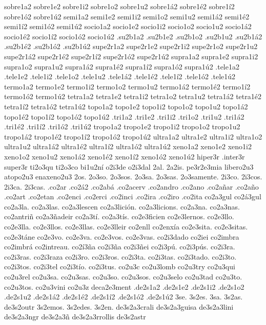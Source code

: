 {sobre1a2 sobre1e2 sobre1i2 sobre1o2 sobre1u2 sobre1á2 sobre1é2 sobre1í2 sobre1ó2 sobre1ú2
semi1a2 semi1e2 semi1i2 semi1o2 semi1u2 semi1á2 semi1é2 semi1í2 semi1ó2 semi1ú2
socio1a2 socio1e2 socio1i2 socio1o2 socio1u2 socio1á2 socio1é2 socio1í2 socio1ó2 socio1ú2
.su2b1a2 .su2b1e2          .su2b1o2 .su2b1u2 .su2b1á2 .su2b1é2           .su2b1ó2 .su2b1ú2
supe2r1a2 supe2r1e2 supe2r1i2 supe2r1o2 supe2r1u2 supe2r1á2 supe2r1é2 supe2r1í2 supe2r1ó2 supe2r1ú2
supra1a2 supra1e2 supra1i2 supra1o2 supra1u2 supra1á2 supra1é2 supra1í2 supra1ó2 supra1ú2
.tele1a2 .tele1e2 .tele1i2 .tele1o2 .tele1u2 .tele1á2 .tele1é2 .tele1í2 .tele1ó2 .tele1ú2
termo1a2 termo1e2 termo1i2 termo1o2 termo1u2 termo1á2 termo1é2 termo1í2 termo1ó2 termo1ú2
tetra1a2 tetra1e2 tetra1i2 tetra1o2 tetra1u2 tetra1á2 tetra1é2 tetra1í2 tetra1ó2 tetra1ú2
topo1a2 topo1e2 topo1i2 topo1o2 topo1u2 topo1á2 topo1é2 topo1í2 topo1ó2 topo1ú2
.tri1a2 .tri1e2 .tri1i2 .tri1o2 .tri1u2 .tri1á2 .tri1é2 .tri1í2 .tri1ó2 .tri1ú2
tropo1a2 tropo1e2 tropo1i2 tropo1o2 tropo1u2 tropo1á2 tropo1é2 tropo1í2 tropo1ó2 tropo1ú2
ultra1a2 ultra1e2 ultra1i2 ultra1o2 ultra1u2 ultra1á2 ultra1é2 ultra1í2 ultra1ó2 ultra1ú2
xeno1a2 xeno1e2 xeno1i2 xeno1o2 xeno1u2 xeno1á2 xeno1é2 xeno1í2 xeno1ó2 xeno1ú2
%
hiper3r .inter3r super3r
%
ti2o3qu ti2o3co bi1u2ní o2i3de o2i3dal 2al. 2a2is. pe3r2e3mia
%
libero2u3
atopo2u3
enaxeno2u3
%
2os. 2o3so. 2o3sos. 2o3sa. 2o3sas. 2o3samente.
2i3co. 2i3cos. 2i3ca. 2i3cas.
%
%
.co2ar
.co2á2
.co2abá
.co2acerv
.co2andro
.co2ano
.co2añar
.co2año
.co2art
.co2etan
.co2enci
.co2erci
.co2inci
.co2ira
.co2iro
.co2ita
%
co2a3gul
co2á3gul
co2a3la.
co2a3las.
co2a3lescen
co2a3lición.
co2a3licions.
co2a3na.
co2a3nas.
co2antriñ
co2a3ñadeir
co2a3tí.
co2a3tís.
co2e3ficien
co2e3lernos.
co2e3llo.
co2e3lla.
co2e3llos.
co2e3llas.
co2e3lleir
co2enll
co2enxía
co2e3sita.
co2e3sitas.
co2e3táne
co2e3vo.
co2e3va.
co2e3vos.
co2e3vas.
co2i3dado
co2iei
co2imbra
co2imbrá
co2intreau.
co2í3ña
co2i3ña
co2i3ñei
co2i3pú.
co2i3pús.
co2i3ra.
co2i3ras.
co2i3raza
co2i3ro.
co2i3ros.
co2i3ta.
co2i3tas.
co2i3tado.
co2i3to.
co2i3tos.
co2i3tel
co2i3tío.
co2i3tus.
co2u3c
co2u3lomb
co2u3try
co2u3qui
co2u3rel
co2u3sa.
co2u3sas.
co2u3so.
co2u3sos.
co2u3selo
co2u3tad
co2u3to.
co2u3tos.
co2u3vini
co2u3z
deca2e3ment
.de2s1a2 .de2s1e2 .de2s1i2 .de2s1o2 .de2s1u2 .de2s1á2 .de2s1é2 .de2s1í2 .de2s1ó2 .de2s1ú2
3se. 3s2es. 3sa. 3s2as. de3s2outr 3s2emos. 3s2edes. 3s2en.
%
de3s2a3crali
de3s2a3guisa
de3s2a3lini
de3s2a3ngr
de3s2a3ñ
de3s2a3rrollis
de3s2astr
}
